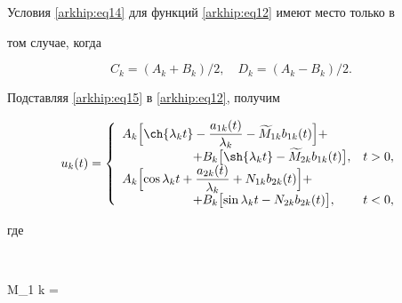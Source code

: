 Условия \eqref{arkhip:eq14} для функций \eqref{arkhip:eq12} имеют место только в

том случае, когда

\begin{equation} \label{arkhip:eq15}

C_{k} = ({A_{k} + B_{k}})/{2}, \quad D_{k} = ({A_{k} - B_{k}})/{2}.

\end{equation}

Подставляя \eqref{arkhip:eq15} в \eqref{arkhip:eq12}, получим

\begin{equation} \label{arkhip:eq16}

u_{k} (t) = \left\{ 

\begin{array} {ll} 

\displaystyle 

A_{k}\Bigl[\ch{\lambda_{k} t} - \frac{a_{1k} (t)}{\lambda_{k}} - \widetilde M_{1 k}b_{1 k}(t)\Bigr] 

+  

\\

\displaystyle 

\hspace{2cm}

 + B_{k} \bigl[\sh{\lambda_{k} t} - \widetilde M_{2 k}b_{1k}(t)\bigr], & t > 0,

\\ 

\displaystyle 

A_{k} \Bigl[ \cos {\lambda_{k}t} + \frac{a_{2k} (t)}{\lambda_{k}} + N_{1 k}  b_{2 k}(t)\Bigr]  + \\

\hspace{2cm}

\displaystyle 

 + B_{k}\bigl[\sin {\lambda_{k} t} - N_{2 k}b_{2 k}(t)\bigr], & t < 0,

\end{array} \right.

\end{equation}

где

$$

\widetilde M_{1 k} = \displaystyle{}

